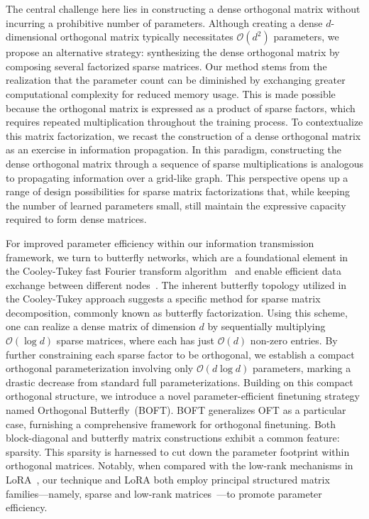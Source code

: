 The central challenge here lies in constructing a dense orthogonal matrix without incurring a prohibitive number of parameters. Although creating a dense $d$-dimensional orthogonal matrix typically necessitates $\mathcal{O}(d^2)$ parameters, we propose an alternative strategy: synthesizing the dense orthogonal matrix by composing several factorized sparse matrices. Our method stems from the realization that the parameter count can be diminished by exchanging greater computational complexity for reduced memory usage. This is made possible because the orthogonal matrix is expressed as a product of sparse factors, which requires repeated multiplication throughout the training process. To contextualize this matrix factorization, we recast the construction of a dense orthogonal matrix as an exercise in information propagation. In this paradigm, constructing the dense orthogonal matrix through a sequence of sparse multiplications is analogous to propagating information over a grid-like graph. This perspective opens up a range of design possibilities for sparse matrix factorizations that, while keeping the number of learned parameters small, still maintain the expressive capacity required to form dense matrices.

For improved parameter efficiency within our information transmission framework, we turn to butterfly networks, which are a foundational element in the Cooley-Tukey fast Fourier transform algorithm~\cite{cooley1965algorithm} and enable efficient data exchange between different nodes~\cite{klasing1994broadcasting}. The inherent butterfly topology utilized in the Cooley-Tukey approach suggests a specific method for sparse matrix decomposition, commonly known as butterfly factorization. Using this scheme, one can realize a dense matrix of dimension $d$ by sequentially multiplying $\mathcal{O}(\log d)$ sparse matrices, where each has just $\mathcal{O}(d)$ non-zero entries. By further constraining each sparse factor to be orthogonal, we establish a compact orthogonal parameterization involving only $\mathcal{O}(d\log d)$ parameters, marking a drastic decrease from standard full parameterizations. Building on this compact orthogonal structure, we introduce a novel parameter-efficient finetuning strategy named Orthogonal Butterfly~(BOFT). BOFT generalizes OFT as a particular case, furnishing a comprehensive framework for orthogonal finetuning. Both block-diagonal and butterfly matrix constructions exhibit a common feature: sparsity. This sparsity is harnessed to cut down the parameter footprint within orthogonal matrices. Notably, when compared with the low-rank mechanisms in LoRA~\cite{hulora2022}, our technique and LoRA both employ principal structured matrix families—namely, sparse and low-rank matrices~\cite{candes2011robust}—to promote parameter efficiency.

